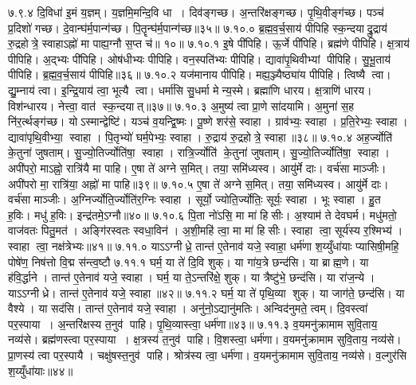 ७.९.४
दि॒विधा॑ इ॒मं य॒ज्ञम्। य॒ज्ञमि॒मन्दि॒वि धा। दिव॑ङ्गच्छ। अ॒न्तरि॑क्षङ्गच्छ। पृ॒थि॒वीङ्ग॑च्छ। पञ्च॑ प्र॒दिशो॑ गच्छ। दे॒वान्घ॑र्म॒पान्ग॑च्छ। पि॒तॄन्घ॑र्म॒पान्ग॑च्छ॥३५॥
७.१०.०
ब्र॒ह्म॒व॒र्च॒साय॑ पीपिहि स्क॒न्दयाद्रु॒द्राय॑ रु॒द्रहोत्रे॒ स्वाहाऽह्नो॑ मा पाह्य॒ग्नौ स॒प्त च॑॥ १०॥
\anuvakamend
७.१०.१
इ॒षे पी॑पिहि। ऊ॒र्जे पी॑पिहि। ब्रह्म॑णे पीपिहि। क्ष॒त्राय॑ पीपिहि। अ॒द्भ्यः पी॑पिहि। ओष॑धीभ्यः पीपिहि। वन॒स्पति॑भ्यः पीपिहि। द्यावा॑पृ॒थिवीभ्यां पीपिहि। सु॒भू॒ताय॑ पीपिहि। ब्र॒ह्म॒व॒र्च॒साय॑ पीपिहि॥३६॥
७.१०.२
यज॑मानाय पीपिहि। मह्य॒ञ्ज्यैष्ठ्या॑य पीपिहि। त्विष्यै त्वा। द्यु॒म्नाय॑ त्वा। इ॒न्द्रि॒याय॑ त्वा॒ भूत्यै त्वा। धर्मा॑सि सु॒धर्मा मेन्य॒स्मे। ब्रह्मा॑णि धारय। क्ष॒त्राणि॑ धारय। विश॑न्धारय। नेत्त्वा॒ वात॑ स्क॒न्दयात्॥३७॥
७.१०.३
अ॒मुष्य॑ त्वा प्रा॒णे सा॑दयामि। अ॒मुना॑ स॒ह नि॑र॒र्त्थङ्ग॑च्छ। योऽस्मान्द्वेष्टि॑। यञ्च॑ व॒यन्द्वि॒ष्मः। पू॒ष्णे शर॑से॒ स्वाहा। ग्राव॑भ्यः॒ स्वाहा। प्र॒ति॒रेभ्यः॒ स्वाहा। द्यावा॑पृथि॒वीभ्या॒ स्वाहा। पि॒तृभ्यो॑ घर्म॒पेभ्यः॒ स्वाहा। रु॒द्राय॑ रु॒द्रहोत्रे॒ स्वाहा॥३८॥
७.१०.४
अह॒र्ज्योति॑ के॒तुना॑ जुषताम्। सु॒ज्यो॒तिर्ज्योति॑षा॒ स्वाहा। रात्रि॒र्ज्योति॑ के॒तुना॑ जुषताम्। सु॒ज्यो॒तिर्ज्योति॑षा॒ स्वाहा। अपी॑परो॒ माऽह्नो॒ रात्रि॑यै मा पाहि। ए॒षा ते॑ अग्ने स॒मित्। तया॒ समि॑ध्यस्व। आयु॑र्मे दाः। वर्च॑सा माञ्जीः। अपी॑परो मा॒ रात्रि॑या॒ अह्नो॑ मा पाहि॥३९॥
७.१०.५
ए॒षा ते॑ अग्ने स॒मित्। तया॒ समि॑ध्यस्व। आयु॑र्मे दाः। वर्च॑सा माञ्जीः। अ॒ग्निर्ज्योति॒र्ज्योति॑र॒ग्निः स्वाहा। सूर्यो॒ ज्योति॒र्ज्योतिः॒ सूर्यः॒ स्वाहा। भूः स्वाहा। हु॒त ह॒विः। मधु॑ ह॒विः। इन्द्र॑तमे॒ऽग्नौ॥४०॥
७.१०.६
पि॒ता नो॑ऽसि॒ मा मा॑ हिसीः। अ॒श्याम॑ ते देवघर्म। मधु॑मतो॒ वाज॑वतः पितु॒मत॑। अङ्गि॑रस्वतः स्वधा॒विन॑। अ॒शी॒महि॑ त्वा॒ मा मा॑ हिसीः। स्वाहा त्वा॒ सूर्य॑स्य र॒श्मिभ्य॑। स्वाहा त्वा॒ नक्ष॑त्रेभ्यः॥४१॥
७.११.०
याऽऽग्नीध्रे॒ तान्त॑ ए॒तेनाव॑ यजे॒ स्वाहा॒ धर्म॑णा श॒य्युँधा॑याः प्यासिषी॒महि॒ पोषे॑ण॒ निष॑त्तो वि॒द्म स॑न्त्व॒ष्टौ
\anuvakamend
७.११.१
घर्म॒ या ते॑ दि॒वि शुक्। या गा॑य॒त्रे छन्द॑सि। या ब्राह्म॒णे। या ह॑वि॒र्द्धाने। तान्त॑ ए॒तेनाव॑ यजे॒ स्वाहा। घर्म॒ या ते॒ऽन्तरि॑क्षे॒ शुक्। या त्रैष्टु॑भे॒ छन्द॑सि। या रा॑ज॒न्ये। याऽऽग्नीध्रे। तान्त॑ ए॒तेनाव॑ यजे॒ स्वाहा॥४२॥
७.११.२
घर्म॒ या ते॑ पृथि॒व्या शुक्। या जाग॑ते॒ छन्द॑सि। या वैश्ये। या सद॑सि। तान्त॑ ए॒तेनाव॑ यजे॒ स्वाहा। अनु॑नो॒ऽद्यानु॑मतिः। अन्विद॑नुमते॒ त्वम्। दि॒वस्त्वा॑ पर॒स्पाया। अ॒न्तरि॑क्षस्य त॒नुव॑ पाहि। पृ॒थि॒व्यास्त्वा॒ धर्म॑णा॥४३॥
७.११.३
व॒यमनु॑क्रामाम सुवि॒ताय॒ नव्य॑से। ब्रह्म॑णस्त्वा पर॒स्पाया। क्ष॒त्रस्य॑ त॒नुव॑ पाहि। वि॒शस्त्वा॒ धर्म॑णा। व॒यमनु॑क्रामाम सुवि॒ताय॒ नव्य॑से। प्रा॒णस्य॑ त्वा पर॒स्पायै। चक्षु॑षस्त॒नुव॑ पाहि। श्रोत्र॑स्य त्वा॒ धर्म॑णा। व॒यमनु॑क्रामाम सुवि॒ताय॒ नव्य॑से। व॒ल्गुर॑सि श॒य्युँधा॑याः॥४४॥
